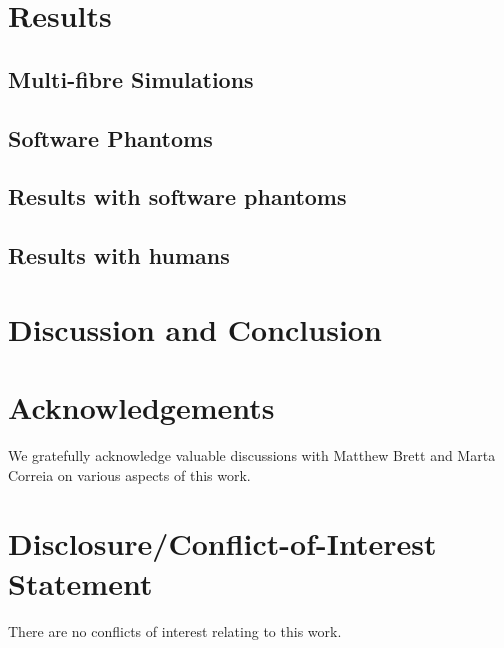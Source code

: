 \documentclass{bioinfo}
\begin{document}
\section{Results}

\subsection{Multi-fibre Simulations\label{sub:Multi-fiber-Simulations}}

\subsection{Software Phantoms\label{sub:Digital-Phantoms}}

\subsection{Results with software phantoms}

\subsection{Results with humans}

\section{Discussion and Conclusion}

\section*{Acknowledgements}
We gratefully acknowledge valuable discussions with Matthew Brett and Marta Correia on various aspects of this work.

\section*{Disclosure/Conflict-of-Interest Statement}
There are no conflicts of interest relating to this work.

%

%
%
%
%

\end{document}
